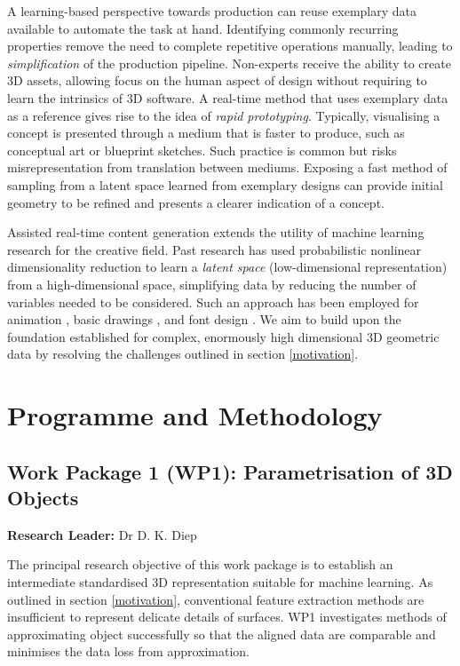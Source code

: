 \documentclass[a4paper, fontsize=15pt, onecolumn]{article} %
\numberwithin{equation}{section} %
\numberwithin{figure}{section} %
\numberwithin{table}{section} %
\begin{document}
A learning-based perspective towards production can reuse exemplary data available to automate the task at hand.
Identifying commonly recurring properties remove the need to complete repetitive operations manually, leading to \textit{simplification} of the production pipeline. Non-experts receive the ability to create 3D assets, allowing focus on the human aspect of design without requiring to learn the intrinsics of 3D software. 
A real-time method that uses exemplary data as a reference gives rise to the idea of \textit{rapid prototyping}. Typically, visualising a concept is presented through a medium that is faster to produce, such as conceptual art or blueprint sketches. Such practice is common but risks misrepresentation from translation between mediums. Exposing a fast method of sampling from a latent space learned from exemplary designs can provide initial geometry to be refined and presents a clearer indication of a concept.

Assisted real-time content generation extends the utility of machine learning research for the creative field. Past research has used probabilistic nonlinear dimensionality reduction to learn a \textit{latent space} (low-dimensional representation) from a high-dimensional space, simplifying data by reducing the number of variables needed to be considered. Such an approach has been employed for animation \cite{styleik}, basic drawings \cite{latentdoodle}, and font design \cite{fontmanifold}. We aim to build upon the foundation established for complex, enormously high dimensional 3D geometric data by resolving the challenges outlined in section \ref{motivation}.


\section{Programme and Methodology}
\subsection*{Work Package 1 (WP1): Parametrisation of 3D Objects}
\textbf{Research Leader:} Dr D. K. Diep\par

The principal research objective of this work package is to establish an intermediate standardised 3D representation suitable for machine learning. As outlined in section \ref{motivation}, conventional feature extraction methods are insufficient to represent delicate details of surfaces. WP1 investigates methods of approximating object successfully so that the aligned data are comparable and minimises the data loss from approximation.
\end{document}
